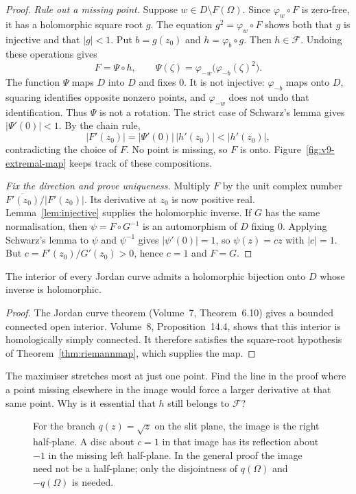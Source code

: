 \begin{proof}
\emph{Rule out a missing point.}
Suppose $w\in D\setminus F(\Omega)$. Since
$\varphi_w\circ F$ is zero-free, it has a holomorphic square root $g$.
The equation $g^2=\varphi_w\circ F$ shows both that $g$ is injective
and that $|g|<1$. Put $b=g(z_0)$ and $h=\varphi_b\circ g$.
Then $h\in\mathcal F$. Undoing these operations gives
\[
 F=\Psi\circ h,\qquad
 \Psi(\zeta)=\varphi_{-w}\bigl(\varphi_{-b}(\zeta)^2\bigr).
\]
The function $\Psi$ maps $D$ into $D$ and fixes $0$.
It is not injective: $\varphi_{-b}$ maps onto $D$, squaring identifies
opposite nonzero points, and $\varphi_{-w}$ does not undo that
identification. Thus $\Psi$ is not a rotation. The strict case of
Schwarz's lemma gives $|\Psi'(0)|<1$. By the chain rule,
\[
 |F'(z_0)|=|\Psi'(0)|\,|h'(z_0)|<|h'(z_0)|,
\]
contradicting the choice of $F$. No point is missing, so $F$ is onto.
Figure~\ref{fig:v9-extremal-map} keeps track of these compositions.

\emph{Fix the direction and prove uniqueness.}
Multiply $F$ by the unit complex number
$\overline{F'(z_0)}/|F'(z_0)|$. Its derivative at $z_0$ is now positive
real. Lemma~\ref{lem:injective} supplies the holomorphic inverse.
If $G$ has the same normalisation, then $\psi=F\circ G^{-1}$ is an
automorphism of $D$ fixing $0$. Applying Schwarz's lemma to $\psi$ and
$\psi^{-1}$ gives $|\psi'(0)|=1$, so $\psi(z)=cz$ with $|c|=1$.
But $c=F'(z_0)/G'(z_0)>0$, hence $c=1$ and $F=G$.
\end{proof}

\begin{corollary}\label{cor:jordanconformal}
The interior of every Jordan curve admits a holomorphic bijection onto $D$
whose inverse is holomorphic.
\end{corollary}
\begin{proof}
The Jordan curve theorem (Volume~7, Theorem~6.10) gives a bounded connected
open interior. Volume~8, Proposition~14.4, shows that this interior is
homologically simply connected. It therefore satisfies the square-root
hypothesis of Theorem~\ref{thm:riemannmap}, which supplies the map.
\end{proof}

\begin{think}
The maximiser stretches most at just one point. Find the line in the proof
where a point missing elsewhere in the image would force a larger derivative
at that same point. Why is it essential that $h$ still belongs to
$\mathcal F$?
\end{think}

\begin{figure}[ht]
\centering
{}
\caption{For the branch $q(z)=\sqrt{z}$ on the slit plane, the image is the right half-plane. A disc about $c=1$ in that image has its reflection about $-1$ in the missing left half-plane. In the general proof the image need not be a half-plane; only the disjointness of $q(\Omega)$ and $-q(\Omega)$ is needed.}
\label{fig:v9-root-separation}
\end{figure}

